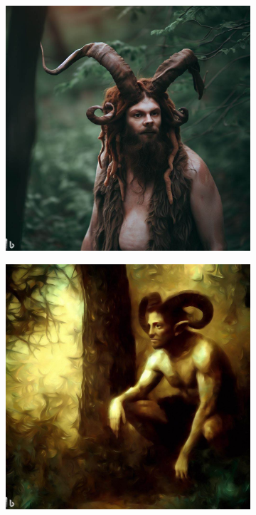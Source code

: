 \documentclass[11pt, twoside]{article}
\begin{document}
\begin{figure}[H]
\centering
\caption{Faune}
\label{fig:faun}
  \begin{subfigure}{0.3\textwidth}
    \centering
    \includegraphics[width=0.99\linewidth]{faun1.jpeg}
  \end{subfigure}%
  \begin{subfigure}{0.3\textwidth}
    \centering
    \includegraphics[width=0.99\linewidth]{faun2.jpeg}

\end{subfigure}
\end{figure}
\end{document}
